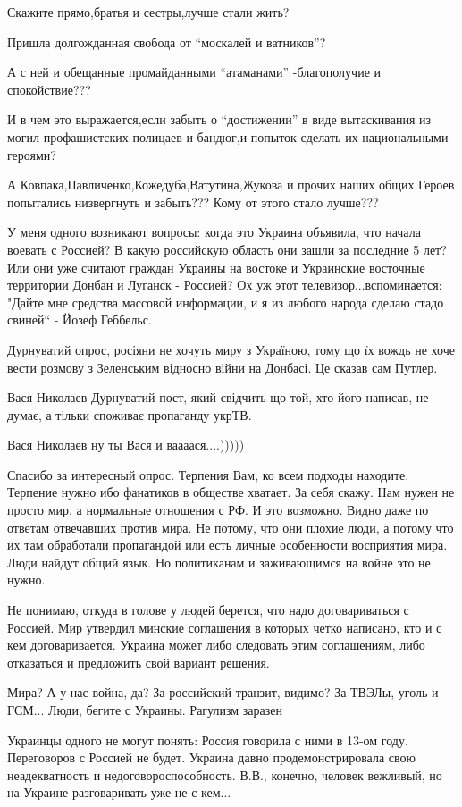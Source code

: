 \begin{itemize}
Скажите прямо,братья и сестры,лучше стали жить?

Пришла долгожданная свобода от \enquote{москалей и ватников}?

А с ней и обещанные промайданными \enquote{атаманами} -благополучие и спокойствие???

И в чем это выражается,если забыть о \enquote{достижении} в виде вытаскивания из могил
профашистских полицаев и бандюг,и попыток сделать их национальными героями?

А Ковпака,Павличенко,Кожедуба,Ватутина,Жукова и прочих наших общих Героев
попытались низвергнуть и забыть???  Кому от этого стало лучше???


У меня одного возникают вопросы: когда это Украина объявила, что начала воевать
с Россией? В какую российскую область они зашли за последние 5 лет?  Или они
уже считают граждан Украины на востоке и Украинские восточные территории Донбан
и Луганск - Россией?  Ох уж этот телевизор...вспоминается: "Дайте мне средства
массовой информации, и я из любого народа сделаю стадо свиней“ - Йозеф
Геббельс.


Дурнуватий опрос, росіяни не хочуть миру з Україною, тому що їх вождь не хоче
вести розмову з Зеленським відносно війни на Донбасі. Це сказав сам Путлер.


Вася Николаев Дурнуватий пост, який свідчить що той, хто його написав, не
думає, а тільки споживає пропаганду укрТВ.


Вася Николаев ну ты Вася и ваааася....)))))


Спасибо за интересный опрос. Терпения Вам, ко всем подходы находите. Терпение
нужно ибо фанатиков в обществе хватает. За себя скажу. Нам нужен не просто мир,
а нормальные отношения с РФ. И это возможно. Видно даже по ответам отвечавших
против мира. Не потому, что они плохие люди, а потому что их там обработали
пропагандой или есть личные особенности восприятия мира. Люди найдут общий
язык. Но политиканам и заживающимся на войне это не нужно.


Не понимаю, откуда в голове у людей берется, что надо договариваться с Россией.
Мир утвердил минские соглашения в которых четко написано, кто и с кем
договаривается. Украина может либо следовать этим соглашениям, либо отказаться
и предложить свой вариант решения.


Мира? А у нас война, да? За российский транзит, видимо? За ТВЭЛы, уголь и
ГСМ... Люди, бегите с Украины. Рагулизм заразен


Украинцы одного не могут понять: Россия говорила с ними в 13-ом году.
Переговоров с Россией не будет. Украина давно продемонстрировала свою
неадекватность и недоговороспособность. В.В., конечно, человек вежливый, но на
Украине разговаривать уже не с кем...

\end{itemize}
